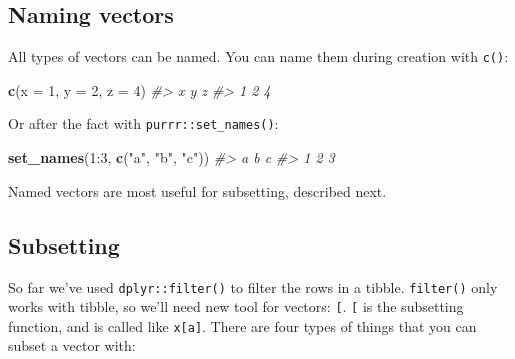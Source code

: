 \documentclass[]{book}
\newenvironment{Shaded}{\begin{snugshade}}{\end{snugshade}}
\newcommand{\KeywordTok}[1]{\textcolor[rgb]{0.13,0.29,0.53}{\textbf{{#1}}}}
\newcommand{\DataTypeTok}[1]{\textcolor[rgb]{0.13,0.29,0.53}{{#1}}}
\newcommand{\DecValTok}[1]{\textcolor[rgb]{0.00,0.00,0.81}{{#1}}}
\newcommand{\StringTok}[1]{\textcolor[rgb]{0.31,0.60,0.02}{{#1}}}
\newcommand{\CommentTok}[1]{\textcolor[rgb]{0.56,0.35,0.01}{\textit{{#1}}}}
\newcommand{\NormalTok}[1]{{#1}}
\begin{document}
\subsection{Naming vectors}\label{naming-vectors}

All types of vectors can be named. You can name them during creation
with \texttt{c()}:

\begin{Shaded}
\begin{Highlighting}[]
\KeywordTok{c}\NormalTok{(}\DataTypeTok{x =} \DecValTok{1}\NormalTok{, }\DataTypeTok{y =} \DecValTok{2}\NormalTok{, }\DataTypeTok{z =} \DecValTok{4}\NormalTok{)}
\CommentTok{#> x y z }
\CommentTok{#> 1 2 4}
\end{Highlighting}
\end{Shaded}

Or after the fact with \texttt{purrr::set\_names()}:

\begin{Shaded}
\begin{Highlighting}[]
\KeywordTok{set_names}\NormalTok{(}\DecValTok{1}\NormalTok{:}\DecValTok{3}\NormalTok{, }\KeywordTok{c}\NormalTok{(}\StringTok{"a"}\NormalTok{, }\StringTok{"b"}\NormalTok{, }\StringTok{"c"}\NormalTok{))}
\CommentTok{#> a b c }
\CommentTok{#> 1 2 3}
\end{Highlighting}
\end{Shaded}

Named vectors are most useful for subsetting, described next.

\hypertarget{vector-subsetting}{\subsection{Subsetting}\label{vector-subsetting}}

So far we've used \texttt{dplyr::filter()} to filter the rows in a
tibble. \texttt{filter()} only works with tibble, so we'll need new tool
for vectors: \texttt{{[}}. \texttt{{[}} is the subsetting function, and
is called like \texttt{x{[}a{]}}. There are four types of things that
you can subset a vector with:
\end{document}
